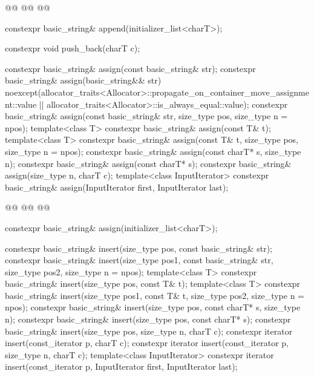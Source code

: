\documentclass{wg21}
\begin{document}
\begin{codeblock}
{{        @@
        @@
        @@
        
        constexpr basic_string& append(initializer_list<charT>);
        
        constexpr void push_back(charT c);
        
        constexpr basic_string& assign(const basic_string& str);
        constexpr basic_string& assign(basic_string&& str)
        noexcept(allocator_traits<Allocator>::propagate_on_container_move_assignment::value ||
        allocator_traits<Allocator>::is_always_equal::value);
        constexpr basic_string& assign(const basic_string& str, size_type pos, size_type n = npos);
        template<class T>
        constexpr basic_string& assign(const T& t);
        template<class T>
        constexpr basic_string& assign(const T& t, size_type pos, size_type n = npos);
        constexpr basic_string& assign(const charT* s, size_type n);
        constexpr basic_string& assign(const charT* s);
        constexpr basic_string& assign(size_type n, charT c);
        template<class InputIterator>
        constexpr basic_string& assign(InputIterator first, InputIterator last);
        
        @@
        @@
        @@
        
        constexpr basic_string& assign(initializer_list<charT>);
        
        constexpr basic_string& insert(size_type pos, const basic_string& str);
        constexpr basic_string& insert(size_type pos1, const basic_string& str,
        size_type pos2, size_type n = npos);
        template<class T>
        constexpr basic_string& insert(size_type pos, const T& t);
        template<class T>
        constexpr basic_string& insert(size_type pos1, const T& t,
        size_type pos2, size_type n = npos);
        constexpr basic_string& insert(size_type pos, const charT* s, size_type n);
        constexpr basic_string& insert(size_type pos, const charT* s);
        constexpr basic_string& insert(size_type pos, size_type n, charT c);
        constexpr iterator insert(const_iterator p, charT c);
        constexpr iterator insert(const_iterator p, size_type n, charT c);
        template<class InputIterator>
        constexpr iterator insert(const_iterator p, InputIterator first, InputIterator last);
        
}}
\end{codeblock}
\end{document}
